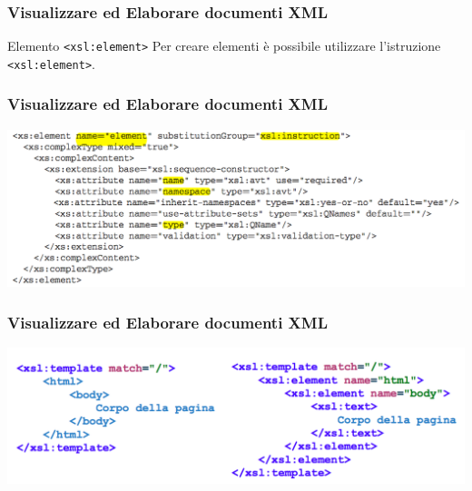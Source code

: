 \begin{frame}
    \frametitle{Visualizzare ed Elaborare documenti XML}
    \addtocounter{nframe}{1}
    

     \begin{block}{Elemento \texttt{<xsl:element>}}
        Per creare elementi è possibile utilizzare l'istruzione \texttt{<xsl:element>}.
     \end{block}

\end{frame}

\begin{frame}
    \frametitle{Visualizzare ed Elaborare documenti XML}
    \addtocounter{nframe}{1}
    
    \begin{center}
        \includegraphics[width=.95\textwidth]{imgs/Schema-element.png}
    \end{center}

\end{frame}

\begin{frame}
    \frametitle{Visualizzare ed Elaborare documenti XML}
    \addtocounter{nframe}{1}
    
    \begin{center}
        \includegraphics[width=.95\textwidth]{imgs/element-example.png}
    \end{center}

\end{frame}


